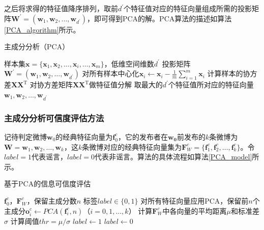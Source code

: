 \documentclass[a4paper,AutoFakeBold,oneside,12pt]{book}
\begin{document}
之后将求得的特征值降序排列，取前$d^\prime$个特征值对应的特征向量组成所需的投影矩阵$\bm{W}^\prime =(\bm{w}_1,\bm{w}_2,\ldots,\bm{w}_{d^\prime})$，即可得到PCA的解。PCA算法的描述如算法\ref{PCA_algorithm}所示。
\begin{algorithm} 
\caption{主成分分析（PCA）} 
\label{PCA_algorithm}
\renewcommand{\algorithmicrequire}{\textbf{输入：}}
\renewcommand{\algorithmicensure}{\textbf{输出：}} 
\begin{algorithmic}[1] 
\Require 样本集$\bm{x}=\{\bm{x}_1,\bm{x}_2,\ldots,\bm{x}_i,\ldots,\bm{x}_m\}$，低维空间维数$d^\prime$ 
\Ensure 投影矩阵  $\bm{W}^\prime =(\bm{w}_1,\bm{w}_2,\ldots,\bm{w}_{d^\prime})$
\State 对所有样本中心化$\bm{x}_i \gets \bm{x}_i - \frac{1}{m}\sum_{i=1}^m \bm{x}_i$
\State  计算样本的协方差$\bm{X}\bm{X}^ \mathrm{T}$
\State 对协方差矩阵$\bm{X}\bm{X}^ \mathrm{T}$做特征值分解
\State 取最大的$d^\prime$个特征值所对应的特征向量$\bm{w}_1,\bm{w}_2,\ldots,\bm{w}_{d^\prime}$
\end{algorithmic}  
\end{algorithm}

\subsubsection{主成分分析可信度评估方法}
记待判定微博$\bm{w}_0$的经典特征向量为$\bm{f}^{c}_{0}$，它的发布者在$\bm{w_0}$前发布的$k$条微博为$\bm{W} = \bm{w}_1,\bm{w}_2,\ldots,\bm{w}_k$，这$k$条微博对应的经典特征向量集为$\bm{F}^{c}_{W} = \{ \bm{f}^{c}_{1},\bm{f}^{c}_{2},\ldots,\bm{f}^{c}_{k} \}$。令$label = 1$代表谣言，$label = 0$代表非谣言。算法的具体流程如算法\ref{PCA_model}所示。

\begin{algorithm} 
\caption{基于PCA的信息可信度评估} 
\label{PCA_model}
\renewcommand{\algorithmicrequire}{\textbf{输入：}}
\renewcommand{\algorithmicensure}{\textbf{输出：}} 
	\begin{algorithmic}[1] 
	\Require $\bm{f}^{c}_{0}$，$\bm{F}^{c}_{W}$，保留主成分数$n$
	\Ensure 标签$label\in \{0,1\}$
	\State 对所有特征向量应用PCA，保留前$n$个主成分$\bm{o}^{c}_{i} \gets PCA(\bm{f}^{c}_{i}, n)$（$i = 0,1,\ldots,k$）
	\State 计算$\bm{F}^{c}_{W}$中各向量的平均距离$\mu$和标准差$\sigma$
	\State 计算阈值$thr = {\mu} / {\sigma}$
		\State $ label \gets 1 $
	\Else
		\State $ label \gets 0 $
	\EndIf
	\end{algorithmic}
\end{algorithm}
\end{document}
